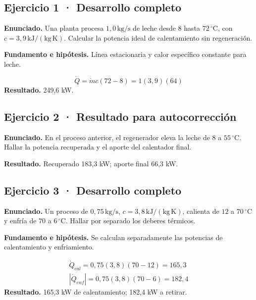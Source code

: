\documentclass[11pt,a4paper]{article}
\begin{document}
\begin{center}\end{center}

\subsection*{Ejercicio 1 · Desarrollo completo}
\textbf{Enunciado.} Una planta procesa \(1{,}0\,\mathrm{kg/s}\) de leche desde \(8\) hasta \(72\,^\circ\mathrm C\), con \(c=3{,}9\,\mathrm{kJ/(kg\,K)}\). Calcular la potencia ideal de calentamiento sin regeneración.

\textbf{Fundamento e hipótesis.} Línea estacionaria y calor específico constante para leche.

\[
\dot Q=\dot mc(72-8)=1(3{,}9)(64)
\]
\textbf{Resultado.} 249,6 kW.


\subsection*{Ejercicio 2 · Resultado para autocorrección}
\textbf{Enunciado.} En el proceso anterior, el regenerador eleva la leche de \(8\) a \(55\,^\circ\mathrm C\). Hallar la potencia recuperada y el aporte del calentador final.

\textbf{Resultado.} Recuperado 183,3 kW; aporte final 66,3 kW.


\subsection*{Ejercicio 3 · Desarrollo completo}
\textbf{Enunciado.} Un proceso de \(0{,}75\,\mathrm{kg/s}\), \(c=3{,}8\,\mathrm{kJ/(kg\,K)}\), calienta de \(12\) a \(70\,^\circ\mathrm C\) y enfría de \(70\) a \(6\,^\circ\mathrm C\). Hallar por separado los deberes térmicos.

\textbf{Fundamento e hipótesis.} Se calculan separadamente las potencias de calentamiento y enfriamiento.

\[
\begin{gathered}
\dot Q_{cal}=0{,}75(3{,}8)(70-12)=165{,}3\\|\dot Q_{enf}|=0{,}75(3{,}8)(70-6)=182{,}4
\end{gathered}
\]
\textbf{Resultado.} 165,3 kW de calentamiento; 182,4 kW a retirar.
\end{document}
